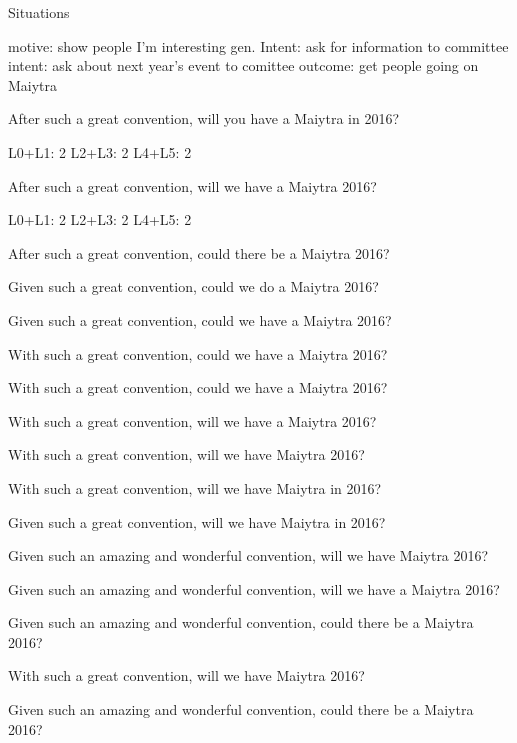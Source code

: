 \documentclass[serif, mathserif, final]{beamer}
\begin{document}
\begin{frame}{}
\begin{columns}
\begin{column}{0.20\linewidth}
\begin{block}{Situations}
\begin{itemize}
{                   motive: show people I'm interesting
                   gen. Intent: ask for information to committee
                   intent: ask about next year's event to comittee
                   outcome: get people going on Maiytra
                   
                   After such a great convention, will you have a 
                   Maiytra in 2016? 
                   
                   L0+L1: 2
                   L2+L3: 2 
                   L4+L5: 2 
                   
                   After such a great convention, will we have a Maiytra 2016?
                   
                   L0+L1: 2
                   L2+L3: 2 
         L4+L5: 2 
         
         
         After such a great convention, could there be a Maiytra 2016?


         Given such a great convention, could we do a Maiytra 2016? 

         Given such a great convention, could we have a Maiytra 2016? 


         
         With such a great convention, could we have a Maiytra 2016? 


         With such a great convention, could we have a Maiytra 2016? 


         With such a great convention, will we have a Maiytra 2016? 

         With such a great convention, will we have Maiytra 2016? 


         With such a great convention, will we have Maiytra in 2016? 

         
         Given such a great convention, will we have Maiytra in 2016?

         Given such an amazing and wonderful convention, will we have
         Maiytra 2016? 

         Given such an amazing and wonderful convention, will we have
         a Maiytra 2016? 

         Given such an amazing and wonderful convention, could there
         be a Maiytra 2016? 


         With such a great convention, will we have Maiytra 2016? 




         Given such an amazing and wonderful convention, could there be a
         Maiytra 2016?


}
\end{itemize}
\end{block}
\end{column}
\end{columns}
\end{frame}
\end{document}
